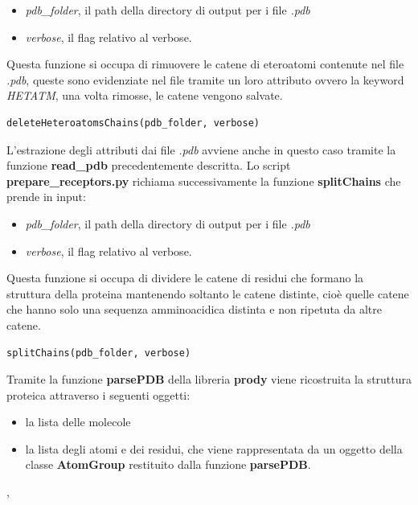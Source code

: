 \begin{itemize}
    \item \textit{pdb\_folder}, il path della directory di output per i file \textit{.pdb}
    \item \textit{verbose}, il flag relativo al verbose.
\end{itemize}

Questa funzione si occupa di rimuovere le catene di eteroatomi contenute nel file \textit{.pdb}, queste sono evidenziate nel file tramite un loro attributo ovvero la keyword \textit{HETATM}, una volta rimosse, le catene vengono salvate. 

\begin{lstlisting}[language=Python, label=lst:code21, caption={funzione deleteHeteroatomsChains}]
deleteHeteroatomsChains(pdb_folder, verbose)
\end{lstlisting}

L'estrazione degli attributi dai file \textit{.pdb} avviene anche in questo caso tramite la funzione \textbf{read\_pdb} precedentemente descritta.\newline
Lo script \textbf{prepare\_receptors.py} richiama successivamente la funzione \textbf{splitChains} che prende in input: 

\begin{itemize}
    \item \textit{pdb\_folder}, il path della directory di output per i file \textit{.pdb}
    \item \textit{verbose}, il flag relativo al verbose.
\end{itemize}

Questa funzione si occupa di dividere le catene di residui che formano la struttura della proteina mantenendo soltanto le catene distinte, cioè quelle catene che hanno solo una sequenza amminoacidica distinta e non ripetuta da altre catene. 

\begin{lstlisting}[language=Python, label=lst:code22, caption={funzione splitChains}]
splitChains(pdb_folder, verbose)    
\end{lstlisting}

Tramite la funzione \textbf{parsePDB} della libreria \textbf{prody} viene ricostruita la struttura proteica attraverso i seguenti oggetti:

\begin{itemize}
    \item la lista delle molecole
    \item la lista degli atomi e dei residui, che viene rappresentata da un oggetto della classe \textbf{AtomGroup} restituito dalla funzione \textbf{parsePDB}.
\end{itemize}
, 

